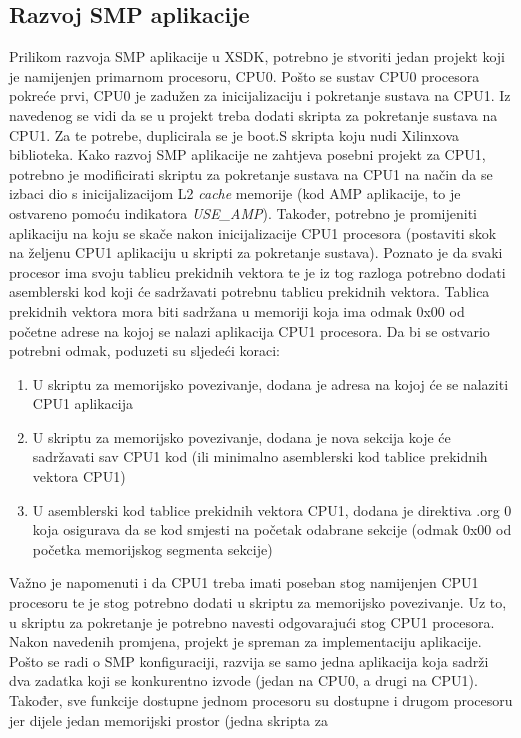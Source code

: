 \documentclass[times, utf8, diplomski, numeric]{fer}
\begin{document}
\subsection{Razvoj SMP aplikacije}
Prilikom razvoja SMP aplikacije u XSDK, potrebno je stvoriti jedan projekt koji je namijenjen primarnom procesoru, CPU0.
Pošto se sustav CPU0 procesora pokreće prvi, CPU0 je zadužen za inicijalizaciju i pokretanje sustava na CPU1. Iz navedenog
se vidi da se u projekt treba dodati skripta za pokretanje sustava na CPU1. Za te potrebe, duplicirala se je boot.S skripta
koju nudi Xilinxova biblioteka. Kako razvoj SMP aplikacije ne zahtjeva posebni projekt za CPU1, potrebno je modificirati
skriptu za pokretanje sustava na CPU1 na način da se izbaci dio s inicijalizacijom L2 \textit{cache} memorije (kod AMP
aplikacije, to je ostvareno pomoću indikatora \textit{USE\_AMP}). Također, potrebno je promijeniti aplikaciju na koju se skače
nakon inicijalizacije CPU1 procesora (postaviti skok na željenu CPU1 aplikaciju u skripti za pokretanje sustava).
Poznato je da svaki procesor ima svoju tablicu
prekidnih vektora te je iz tog razloga potrebno dodati asemblerski kod koji će sadržavati potrebnu tablicu prekidnih vektora.
Tablica prekidnih vektora mora biti sadržana u memoriji koja ima odmak 0x00 od početne adrese na kojoj se nalazi
aplikacija CPU1 procesora. Da bi se ostvario potrebni odmak, poduzeti su sljedeći koraci:
\begin{enumerate}
  \item{U skriptu za memorijsko povezivanje, dodana je adresa na kojoj će se nalaziti CPU1 aplikacija}
  \item{U skriptu za memorijsko povezivanje, dodana je nova sekcija koje će sadržavati sav CPU1 kod (ili minimalno asemblerski
  kod tablice prekidnih vektora CPU1)}
  \item{U asemblerski kod tablice prekidnih vektora CPU1, dodana je direktiva .org 0 koja osigurava da se kod smjesti na
  početak odabrane sekcije (odmak 0x00 od početka memorijskog segmenta sekcije)}
\end{enumerate}
Važno je napomenuti i da CPU1 treba imati poseban stog namijenjen CPU1 procesoru te je stog potrebno dodati u skriptu za
memorijsko povezivanje. Uz to, u skriptu za pokretanje je potrebno navesti odgovarajući stog CPU1 procesora.
Nakon navedenih promjena, projekt je spreman za implementaciju aplikacije. Pošto se radi o SMP konfiguraciji, razvija se
samo jedna aplikacija koja sadrži dva zadatka koji se konkurentno izvode (jedan na CPU0, a drugi na CPU1). Također, sve
funkcije dostupne jednom procesoru su dostupne i drugom procesoru jer dijele jedan memorijski prostor (jedna skripta za
\end{document}
